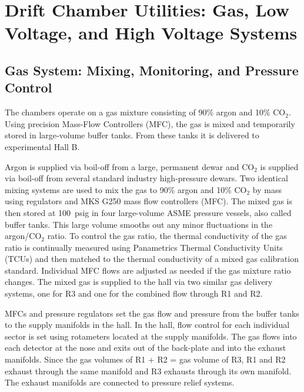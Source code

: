 \section{Drift Chamber Utilities: Gas, Low Voltage, and High Voltage Systems}
\label{utilities}

\subsection{Gas System: Mixing, Monitoring, and Pressure Control}

The chambers operate on a gas mixture consisting of 90\% argon and 10\% CO$_2$.
Using precision Mass-Flow Controllers (MFC), the gas is mixed and temporarily
stored in large-volume buffer tanks.  From these tanks it is delivered
to experimental Hall B.  

Argon is supplied via boil-off from a large, permanent dewar and CO$_2$ is supplied 
via boil-off from several standard industry high-pressure dewars.  Two identical mixing
systems are used to mix the gas to 90\% argon and 10\% CO$_2$ by mass using regulators and MKS G250 
mass flow controllers (MFC).  The mixed gas is then stored at 100~psig in four large-volume 
ASME pressure vessels, also called buffer tanks. This large volume smooths out 
any minor fluctuations in the argon/CO$_2$ ratio. To control the gas ratio, the thermal 
conductivity of the gas ratio is continually measured using Panametrics Thermal 
Conductivity Units (TCUs) and then matched to the thermal conductivity of a mixed 
gas calibration standard. Individual MFC flows are adjusted as needed if the gas mixture
ratio changes. The mixed gas is supplied to the hall via two similar gas delivery systems, 
one for R3 and one for the combined flow through R1 and R2. 

MFCs and pressure regulators set the gas flow and pressure from the 
buffer tanks to the supply manifolds in the hall. In the hall, flow control for each 
individual sector is set using rotameters located at the supply manifolds. The gas flows 
into each detector at the nose and exits out of the back-plate and into the exhaust 
manifolds. Since the gas volumes of R1 + R2 = gas volume of R3, R1 and R2 exhaust 
through the same manifold and R3 exhausts through its own manifold. The exhaust manifolds 
are connected to pressure relief systems. 


